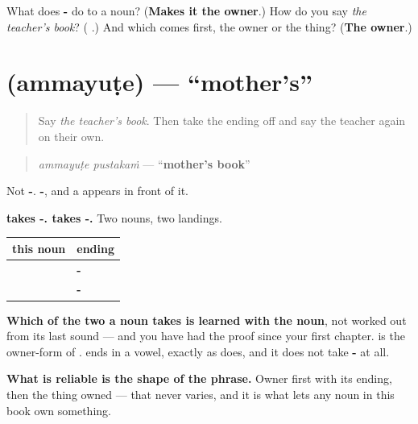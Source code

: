 \begin{tcolorbox}[breakable,colback=teal!4,colframe=teal!35!black,title={Before you move on}]
What does \textbf{-} do to a noun? (\textbf{Makes it the owner}.) How do you say \emph{the teacher's book}? (\emph{\textbf{ }}.) And which comes first, the owner or the thing? (\textbf{The owner}.)
\end{tcolorbox}
\section[\texorpdfstring{\ml{അമ്മയുടെ} (ammayuṭe)}{അമ്മയുടെ (ammayuṭe)}]{ (ammayuṭe) — \textquotedblleft{}mother's\textquotedblright{}}

\label{lesson:ML-C78-ude}



\begin{quote}
Say \emph{the teacher's book}. Then take the ending off and say the teacher again on their own.
\end{quote}

\begin{grammarlens}[title={Grammar Lens: the same job, a different ending}]
\begin{quote}
\textbf{ }
\end{quote}

\begin{quote}
\emph{ammayuṭe pustakaṁ} — \textquotedblleft{}\textbf{mother's book}\textquotedblright{}
\end{quote}

Not \textbf{-}. \textbf{-}, and a \textbf{} appears in front of it.

\textbf{ takes -.  takes -.} Two nouns, two landings.

\noindent
\begin{tabularx}{\linewidth}{@{}>{\raggedright\arraybackslash}X>{\raggedright\arraybackslash}X@{}}
\toprule
\textbf{this noun} & \textbf{ending} \\
\midrule
\textbf{\ml{അധ്യാപകൻ}} & \textbf{-\ml{ന്റെ}} \\
\textbf{\ml{അമ്മ}} & \textbf{-\ml{യുടെ}} \\
\bottomrule
\end{tabularx}

\textbf{Which of the two a noun takes is learned with the noun}, not worked out from its last sound — and you have had the proof since your first chapter. \textbf{} is the owner-form of \textbf{}. \textbf{} ends in a vowel, exactly as \textbf{} does, and it does not take \textbf{-} at all.

\textbf{What is reliable is the shape of the phrase.} Owner first with its ending, then the thing owned — that never varies, and it is what lets any noun in this book own something.
\end{grammarlens}

